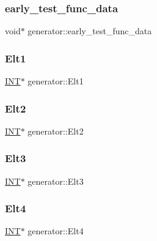 \subsubsection{\texorpdfstring{early\+\_\+test\+\_\+func\+\_\+data}{early\_test\_func\_data}}
{\footnotesize\ttfamily void$\ast$ generator\+::early\+\_\+test\+\_\+func\+\_\+data}

\mbox{\label{classgenerator_a21f9ff1095b1189e0c8b7114e0fc8e17}} 
\subsubsection{\texorpdfstring{Elt1}{Elt1}}
{\footnotesize\ttfamily \mbox{\hyperlink{galois_8h_a09fddde158a3a20bd2dcadb609de11dc}{I\+NT}}$\ast$ generator\+::\+Elt1}

\mbox{\label{classgenerator_a55f2a13fef79322ae27a5bce1403381f}} 
\subsubsection{\texorpdfstring{Elt2}{Elt2}}
{\footnotesize\ttfamily \mbox{\hyperlink{galois_8h_a09fddde158a3a20bd2dcadb609de11dc}{I\+NT}}$\ast$ generator\+::\+Elt2}

\mbox{\label{classgenerator_a07fb82b50fe097094be2d8cbac1548f4}} 
\subsubsection{\texorpdfstring{Elt3}{Elt3}}
{\footnotesize\ttfamily \mbox{\hyperlink{galois_8h_a09fddde158a3a20bd2dcadb609de11dc}{I\+NT}}$\ast$ generator\+::\+Elt3}

\mbox{\label{classgenerator_a065b0b47eb41c9bd25ce53f3d597d463}} 
\subsubsection{\texorpdfstring{Elt4}{Elt4}}
{\footnotesize\ttfamily \mbox{\hyperlink{galois_8h_a09fddde158a3a20bd2dcadb609de11dc}{I\+NT}}$\ast$ generator\+::\+Elt4}

